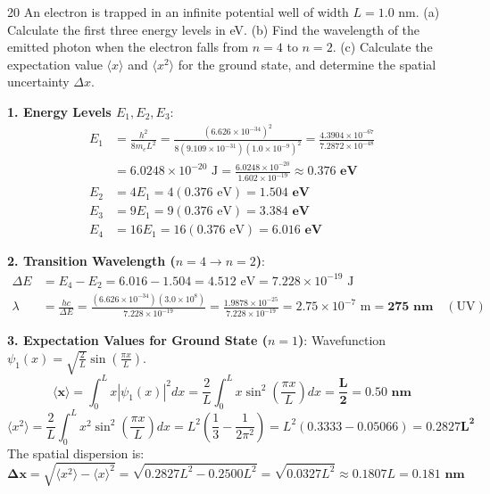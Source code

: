 \begin{theoryq}{20}
An electron is trapped in an infinite potential well of width $L = 1.0\text{ nm}$. (a) Calculate the first three energy levels in eV. (b) Find the wavelength of the emitted photon when the electron falls from $n=4$ to $n=2$. (c) Calculate the expectation value $\langle x \rangle$ and $\langle x^2 \rangle$ for the ground state, and determine the spatial uncertainty $\Delta x$.
\end{theoryq}
\begin{theorysol}
\textbf{1. Energy Levels $E_1, E_2, E_3$}:
\begin{align*}
E_1 &= \frac{h^2}{8 m_e L^2} = \frac{(6.626 \times 10^{-34})^2}{8(9.109 \times 10^{-31})(1.0 \times 10^{-9})^2} = \frac{4.3904 \times 10^{-67}}{7.2872 \times 10^{-48}} \\
&= 6.0248 \times 10^{-20}\text{ J} = \frac{6.0248 \times 10^{-20}}{1.602 \times 10^{-19}} \approx \mathbf{0.376\text{ eV}} \\
E_2 &= 4 E_1 = 4(0.376\text{ eV}) = \mathbf{1.504\text{ eV}} \\
E_3 &= 9 E_1 = 9(0.376\text{ eV}) = \mathbf{3.384\text{ eV}} \\
E_4 &= 16 E_1 = 16(0.376\text{ eV}) = \mathbf{6.016\text{ eV}}
\end{align*}

\textbf{2. Transition Wavelength ($n=4 \to n=2$)}:
\begin{align*}
\Delta E &= E_4 - E_2 = 6.016 - 1.504 = 4.512\text{ eV} = 7.228 \times 10^{-19}\text{ J} \\
\lambda &= \frac{hc}{\Delta E} = \frac{(6.626 \times 10^{-34})(3.0 \times 10^8)}{7.228 \times 10^{-19}} = \frac{1.9878 \times 10^{-25}}{7.228 \times 10^{-19}} = 2.75 \times 10^{-7}\text{ m} = \mathbf{275\text{ nm}}\quad (\text{UV})
\end{align*}

\textbf{3. Expectation Values for Ground State ($n=1$)}:
Wavefunction $\psi_1(x) = \sqrt{\frac{2}{L}}\sin\left(\frac{\pi x}{L}\right)$.
\begin{equation}
\mathbf{\langle x \rangle} = \int_0^L x |\psi_1(x)|^2 dx = \frac{2}{L}\int_0^L x \sin^2\left(\frac{\pi x}{L}\right)dx = \mathbf{\frac{L}{2} = 0.50\text{ nm}}
\end{equation}
\begin{equation}
\langle x^2 \rangle = \frac{2}{L}\int_0^L x^2 \sin^2\left(\frac{\pi x}{L}\right)dx = L^2\left(\frac{1}{3} - \frac{1}{2\pi^2}\right) = L^2(0.3333 - 0.05066) = \mathbf{0.2827 L^2}
\end{equation}
The spatial dispersion is:
\begin{equation}
\mathbf{\Delta x} = \sqrt{\langle x^2 \rangle - \langle x \rangle^2} = \sqrt{0.2827 L^2 - 0.2500 L^2} = \sqrt{0.0327 L^2} \approx 0.1807 L = \mathbf{0.181\text{ nm}}
\end{equation}
\end{theorysol}
\vspace{4mm}
